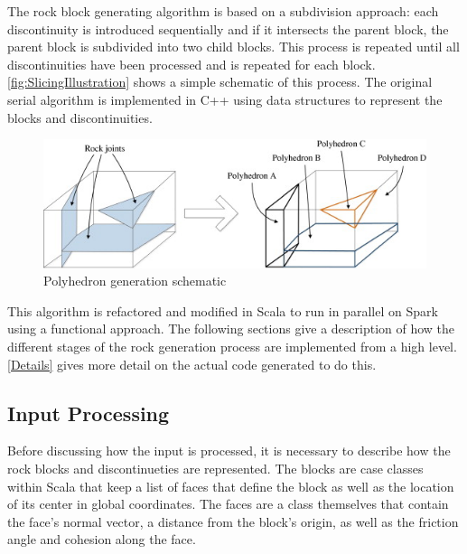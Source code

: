 The rock block generating algorithm is based on a subdivision approach: each discontinuity is introduced sequentially and if it intersects the parent block, the parent block is subdivided into two child blocks. This process is repeated until all discontinuities have been processed and is repeated for each block. \ref{fig:SlicingIllustration} shows a simple schematic of this process. The original serial algorithm is implemented in C++ using data structures to represent the blocks and discontinuities. \par 

\begin{figure}
  \centering
  \includegraphics[width=0.75/textwidth]{SlicingIllustration}
  \caption{Polyhedron generation schematic \parencite{Slicing}}
\end{figure}

This algorithm is refactored and modified in Scala to run in parallel on Spark using a functional approach. The following sections give a description of how the different stages of the rock generation process are implemented from a high level. \ref{Details} gives more detail on the actual code generated to do this. 

\subsection{Input Processing}
Before discussing how the input is processed, it is necessary to describe how the rock blocks and discontinueties are represented. The blocks are case classes within Scala that keep a list of faces that define the block as well as the location of its center in global coordinates. The faces are a class themselves that contain the face's normal vector, a distance from the block's origin, as well as the friction angle and cohesion along the face. \par


